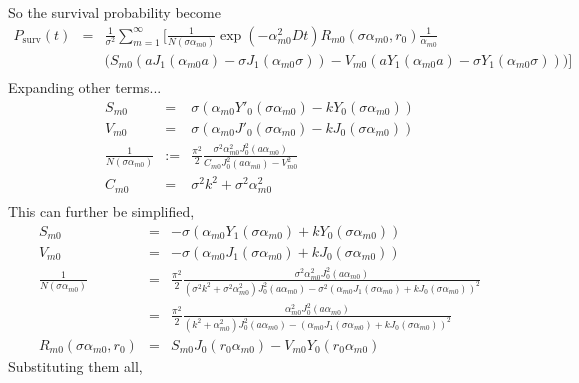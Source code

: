 \documentclass{article}
\begin{document}
%
So the survival probability become
%
\begin{eqnarray}
        P_{\mathrm{surv}}(t)
    &=& \frac{1}{\sigma^2} \sum_{m=1}^{\infty} \Bigg[
        \frac{1}{N(\sigma\alpha_{m0})} \exp(-\alpha_{m0}^2Dt)
        R_{m0}(\sigma\alpha_{m0}, r_0)
        \frac{1}{\alpha_{m0}}
        \nonumber\\
    & & \Big(
        S_{m0} \left(aJ_1(\alpha_{m0}a) - \sigma J_1(\alpha_{m0}\sigma)\right) -
        V_{m0} \left(aY_1(\alpha_{m0}a) - \sigma Y_1(\alpha_{m0}\sigma)\right)
        \Big)
        \Bigg] \nonumber\\
\end{eqnarray}
%
Expanding other terms...
%
\begin{eqnarray}
    S_{m0} &=& \sigma(\alpha_{m0}Y'_0(\sigma\alpha_{m0}) - kY_0(\sigma\alpha_{m0})) \\
    V_{m0} &=& \sigma(\alpha_{m0}J'_0(\sigma\alpha_{m0}) - kJ_0(\sigma\alpha_{m0})) \\
    \frac{1}{N(\sigma\alpha_{m0})} &:=&
        \frac{\pi^2}{2}
        \frac{\sigma^2\alpha_{m0}^2 J^2_0(a\alpha_{m0})}
             {C_{m0} J_0^2(a\alpha_{m0}) - V_{m0}^2} \\
    C_{m0} &=& \sigma^2k^2 + \sigma^2\alpha_{m0}^2\\
\end{eqnarray}
%
This can further be simplified,
%
\begin{eqnarray}
    S_{m0} &=& -\sigma(\alpha_{m0}Y_1(\sigma\alpha_{m0}) + kY_0(\sigma\alpha_{m0})) \\
    V_{m0} &=& -\sigma(\alpha_{m0}J_1(\sigma\alpha_{m0}) + kJ_0(\sigma\alpha_{m0})) \\
    \frac{1}{N(\sigma\alpha_{m0})} &=&
        \frac{\pi^2}{2}
        \frac{\sigma^2\alpha_{m0}^2 J^2_0(a\alpha_{m0})}
             {(\sigma^2k^2 + \sigma^2\alpha_{m0}^2) J_0^2(a\alpha_{m0}) -
              \sigma^2(\alpha_{m0}J_1(\sigma\alpha_{m0}) + kJ_0(\sigma\alpha_{m0}))^2} \\
           &=& \frac{\pi^2}{2}
        \frac{\alpha_{m0}^2 J^2_0(a\alpha_{m0})}
             {(k^2 + \alpha_{m0}^2) J_0^2(a\alpha_{m0}) -
              (\alpha_{m0}J_1(\sigma\alpha_{m0}) + kJ_0(\sigma\alpha_{m0}))^2} \\
    R_{m0}(\sigma\alpha_{m0}, r_0) &=& S_{m0}J_0(r_0\alpha_{m0}) - V_{m0}Y_0(r_0\alpha_{m0})
\end{eqnarray}
%
Substituting them all,
%
\end{document}
